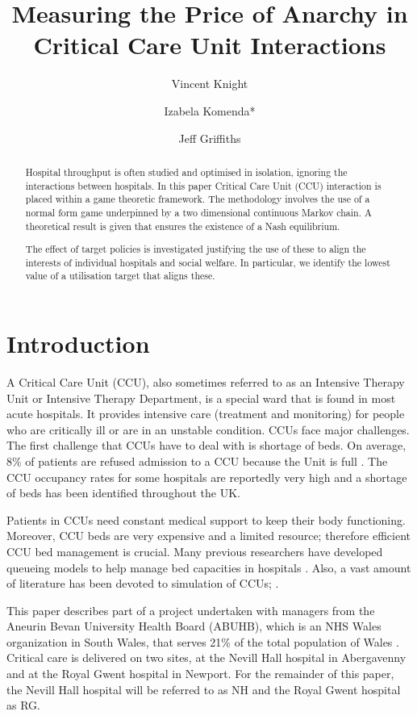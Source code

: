 \documentclass{article}
\title{Measuring the Price of Anarchy in Critical Care Unit Interactions}
\author{Vincent Knight
    \and
        Izabela Komenda*
    \and
        Jeff Griffiths}
\begin{document}
\maketitle

\begin{abstract}
Hospital throughput is often studied and optimised in isolation, ignoring the interactions between hospitals.
In this paper Critical Care Unit (CCU) interaction is placed within a game theoretic framework.
The methodology involves the use of a normal form game underpinned by a two dimensional continuous Markov chain.
A theoretical result is given that ensures the existence of a Nash equilibrium.

The effect of target policies is investigated justifying the use of these to align the interests of individual hospitals and social welfare.
In particular, we identify the lowest value of a utilisation target that aligns these.
\end{abstract}

\section{Introduction}

A Critical Care Unit (CCU), also sometimes referred to as an Intensive Therapy Unit or Intensive Therapy Department, is a special ward that is found in most acute hospitals.
It provides intensive care (treatment and monitoring) for people who are critically ill or are in an unstable condition.
CCUs face major challenges.
The first challenge that CCUs have to deal with is shortage of beds.  On average, 8\% of patients are refused admission to a CCU because the Unit is full \cite{Report}. The CCU occupancy rates for some hospitals are reportedly very high \cite{Mitchell1995,Smith1995} and a shortage of beds has been identified throughout the UK.

Patients in CCUs need constant medical support to keep their body functioning.
Moreover, CCU beds are very expensive and a limited resource; therefore efficient CCU bed management is crucial.
Many previous researchers have developed queueing models to help manage bed capacities in hospitals \cite{Cooper1974,Dumas1984,Gallivan2011,Gorunescu2002a,Griffiths2012,Harper2002a}.
Also, a vast amount of literature has been devoted to simulation of CCUs;  \cite{Cahill1999a,Costa2003,Griffiths2004a,Kim1999,Litvak2008,Shahani2008}.

This paper describes part of a project undertaken with managers from the Aneurin Bevan University Health Board (ABUHB), which is an NHS Wales organization in South Wales, that serves 21\% of the total population of Wales \cite{Board}.
Critical care is delivered on two sites, at the Nevill Hall hospital in Abergavenny and at the Royal Gwent hospital in Newport.
For the remainder of this paper, the Nevill Hall hospital will be referred to as NH and the Royal Gwent hospital as RG.
\end{document}
